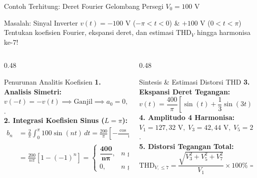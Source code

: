 \documentclass[aspectratio=169,10pt]{beamer}
\begin{document}
\begin{frame}{Contoh Terhitung: Deret Fourier Gelombang Persegi $V_0 = 100\text{ V}$}
  \begin{exampleblock}{Masalah: Sinyal Inverter $v(t) = -100\text{ V}$ ($-\pi < t < 0$) \& $+100\text{ V}$ ($0 < t < \pi$)}
    Tentukan koefisien Fourier, ekspansi deret, dan estimasi $\text{THD}_V$ hingga harmonisa ke-7!
  \end{exampleblock}
  \begin{columns}[t]
    \begin{column}{0.48\textwidth}
      \begin{block}{Penurunan Analitis Koefisien}
        \small
        \textbf{1. Analisis Simetri:}
        $v(-t) = -v(t) \implies \text{Ganjil} \implies a_0 = 0, \, a_n = 0$.\\
        \textbf{2. Integrasi Koefisien Sinus ($L = \pi$):}
        \begin{align*}
          b_n &= \frac{2}{\pi} \int_{0}^{\pi} 100 \sin(nt) \, dt = \frac{200}{\pi} \left[ -\frac{\cos(nt)}{n} \right]_{0}^{\pi} \\
              &= \frac{200}{n\pi} [1 - (-1)^n] = \begin{cases} \mathbf{\dfrac{400}{n\pi}}, & n \text{ ganjil} \\ 0, & n \text{ genap} \end{cases}
        \end{align*}
      \end{block}
    \end{column}
    \begin{column}{0.48\textwidth}
      \begin{alertblock}{Sintesis \& Estimasi Distorsi THD}
        \small
        \textbf{3. Ekspansi Deret Tegangan:}
        \begin{equation*}
          v(t) = \frac{400}{\pi} \left[ \sin(t) + \frac{1}{3}\sin(3t) + \frac{1}{5}\sin(5t) + \dots \right]
        \end{equation*}
        \textbf{4. Amplitudo 4 Harmonisa:}
        $V_1 = 127{,}32\text{ V}, \; V_3 = 42{,}44\text{ V}, \; V_5 = 25{,}46\text{ V}, \; V_7 = 18{,}19\text{ V}$.\\[2pt]
        \textbf{5. Distorsi Tegangan Total:}
        \begin{equation*}
          \text{THD}_{V,\le 7} = \frac{\sqrt{V_3^2 + V_5^2 + V_7^2}}{V_1} \times 100\% = \mathbf{41{,}41\%}
        \end{equation*}
      \end{alertblock}
    \end{column}
  \end{columns}
\end{frame}
\end{document}
